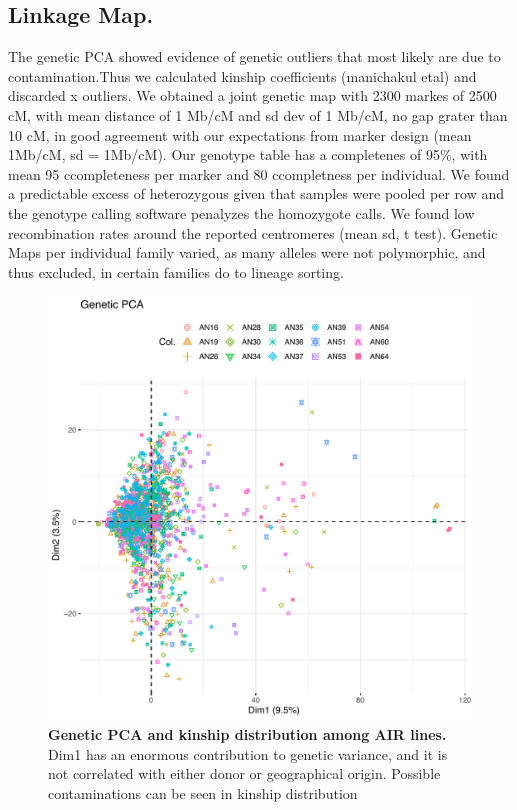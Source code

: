 \subsection{Linkage Map.}
The genetic PCA showed evidence of genetic outliers that most likely are due to contamination.Thus we calculated kinship coefficients (manichakul etal) and discarded x outliers.
We obtained a joint genetic map with 2300 markes of 2500 cM, with mean distance of 1 Mb/cM and sd dev of 1 Mb/cM, no gap grater than 10 cM, in good agreement with our expectations from marker design (mean 1Mb/cM, sd = 1Mb/cM).
Our genotype table has a completenes of 95\%, with mean 95 ccompleteness per marker and 80 ccompletness per individual.
We found a predictable excess of heterozygous given that samples were pooled per row and the genotype calling software penalyzes the homozygote calls.  We found low recombination rates around the reported centromeres (mean sd, t test).
Genetic Maps per individual family varied, as  many alleles were not  polymorphic, and thus excluded, in certain families do to lineage sorting.



\begin{figure}[!ht]
\includegraphics[width=0.8\paperwidth]{Chapter-3/figs/fig3-3.pdf}
\caption{\textbf{Genetic PCA and kinship distribution among AIR lines.}
Dim1 has an enormous contribution to genetic variance, and it is not correlated with either donor or geographical origin. Possible contaminations can be seen in kinship distribution}

\label{Fig3.3}
\end{figure}
\clearpage

